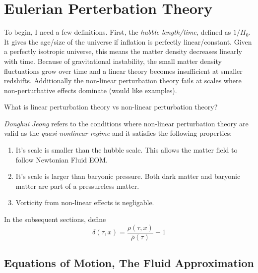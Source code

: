 \chapter{Eulerian Perterbation Theory}
To begin, I need a few definitions. First, the \textit{hubble length/time}, defined as $1/H_0$. It gives the age/size of the universe if inflation is perfectly linear/constant. Given a perfectly isotropic universe, this means the matter density decreases linearly with time. Because of gravitational instability, the small matter density fluctuations grow over time and a linear theory becomes insufficient at smaller redshifts. Additionally the  non-linear perturbation theory fails at scales where non-perturbative effects dominate (would like examples). 

\begin{qn}
	What is linear perturbation theory vs non-linear perturbation theory?
\end{qn}

\textit{Donghui Jeong} refers to the conditions where non-linear perturbation theory are valid as the \textit{quasi-nonlinear regime} and it satisfies the following properties:

\begin{enumerate}
	\item It's scale is smaller than the hubble scale. This allows the matter field to follow Newtonian Fluid EOM.
	\item It's scale is larger than baryonic pressure. Both dark matter and baryonic matter are part of a pressureless matter.
	\item Vorticity from non-linear effects is negligable.
\end{enumerate}
In the subsequent sections, define
\begin{equation}
	\delta(\tau,x) = \frac{\rho(\tau,x)}{\overline{\rho}(\tau)}-1
\end{equation}

\section{Equations of Motion, The Fluid Approximation}
